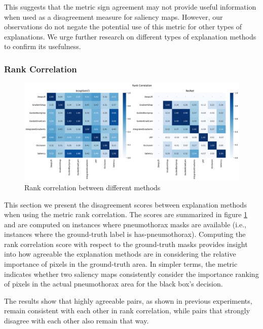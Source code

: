 This suggests that the metric sign agreement may not provide useful information when used as a disagreement measure for saliency maps. However, our observations do not negate the potential use of this metric for other types of explanations. We urge further research on different types of explanation methods to confirm its usefulness.

\subsubsection{Rank Correlation}
\label{subsec:rankCorrelation}

\begin{figure}
    \centering
    \includegraphics[width=\textwidth]{images/results/pneumothorax/rc.png}
    \caption{Rank correlation between different methods}
    \label{fig:rankCorrelation}
\end{figure}
This section we present the disagreement scores between explanation methods when using the metric rank correlation. The scores are summarized in figure \ref{fig:rankCorrelation} and are computed on instances where pneumothorax masks are available (i.e., instances where the ground-truth label is has-pneumothorax). Computing the rank correlation score with respect to the ground-truth masks provides insight into how agreeable the explanation methods are in considering the relative importance of pixels in the ground-truth area. In simpler terms, the metric indicates whether two saliency maps consistently consider the importance ranking of pixels in the actual pneumothorax area for the black box's decision.

The results show that highly agreeable pairs, as shown in previous experiments, remain consistent with each other in rank correlation, while pairs that strongly disagree with each other also remain that way.
